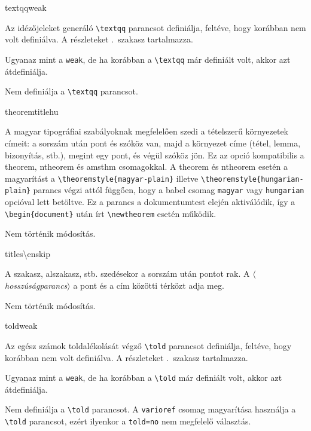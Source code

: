 \documentclass[12pt]{article}
\newcommand\param[1]{{\normalfont\slshape$\langle$#1$\rangle$}}
\begin{document}
\begin{description}
\begin{hunopt}{textqq}{weak}
\item[weak]
Az idézőjeleket generáló \verb|\textqq| parancsot definiálja, feltéve, hogy korábban nem volt definiálva.
A részleteket .~szakasz tartalmazza.
\item[yes]
Ugyanaz mint a \texttt{weak}, de ha korábban a \verb|\textqq| már definiált volt, akkor azt átdefiniálja.
\item[no]
Nem definiálja a \verb|\textqq| parancsot.
\end{hunopt}

\begin{hunopt}{theoremtitle}{hu}
\item[hu]
A magyar tipográfiai szabályoknak megfelelően szedi a tételszerű környezetek címeit: a sorszám után pont és szóköz van, majd a környezet címe (tétel, lemma,
bizonyítás, stb.), megint egy pont, és végül szóköz jön.
Ez az opció kompatibilis a \textsf{theorem}, \textsf{ntheorem} és \textsf{amsthm} csomagokkal.
A \textsf{theorem} és \textsf{ntheorem} esetén a magyarítást a \verb|\theoremstyle{magyar-plain}| illetve \verb|\theoremstyle{hungarian-plain}| parancs végzi attól függően, hogy a \textsf{babel} csomag \texttt{magyar} vagy \texttt{hungarian} opcióval lett betöltve.
Ez a parancs a dokumentumtest elején aktiválódik, így a \verb|\begin{document}| után írt \verb|\newtheorem| esetén működik.
\item[unchanged]
Nem történik módosítás.
\end{hunopt}

\begin{hunopt}{titles}{\textbackslash enskip}
\item[\param{hosszúságparancs}]
A szakasz, alszakasz, stb. szedésekor a sorszám után pontot rak.
A \param{hosszúságparancs} a pont és a cím közötti térközt adja meg.
\item[unchanged]
Nem történik módosítás.
\end{hunopt}

\begin{hunopt}{told}{weak}
\item[weak]
Az egész számok toldalékolását végző \verb|\told| parancsot definiálja, feltéve, hogy korábban nem volt definiálva.
A részleteket .~szakasz tartalmazza.
\item[yes]
Ugyanaz mint a \texttt{weak}, de ha korábban a \verb|\told| már definiált volt, akkor azt átdefiniálja.
\item[no]
Nem definiálja a \verb|\told| parancsot.
A \texttt{varioref} csomag magyarítása használja a \verb|\told| parancsot, ezért ilyenkor a \texttt{told=no} nem megfelelő választás.
\end{hunopt}

\end{description}
\end{document}
